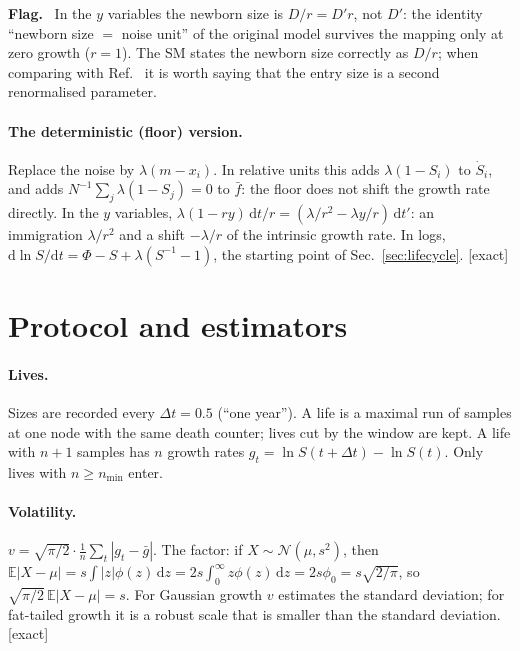 \documentclass[11pt]{article}
\newcommand{\E}{\mathbb E}
\newcommand{\fb}{\bar f}
\newcommand{\dd}{\mathrm d}
\newcommand{\exact}{\textsf{\small[exact]}}
\newenvironment{flag}{\par\medskip\noindent\textcolor{red!70!black}{\textbf{Flag.}}\ }{\par\medskip}
\begin{document}
\begin{flag}
In the $y$ variables the newborn size is $D/r=D'r$, not $D'$: the identity ``newborn size $=$ noise unit''
of the original model survives the mapping only at zero growth ($r=1$).  The SM states the newborn size
correctly as $D/r$; when comparing with Ref.~\cite{altieri2021} it is worth saying that the entry size
is a second renormalised parameter.
\end{flag}

\paragraph{The deterministic (floor) version.}  Replace the noise by $\lambda(m-x_i)$.  In relative units this
adds $\lambda(1-S_i)$ to $\dot S_i$, and adds $N^{-1}\sum_j\lambda(1-S_j)=0$ to $\fb$: the floor does not shift
the growth rate directly.  In the $y$ variables, $\lambda(1-ry)\,\dd t/r=(\lambda/r^2-\lambda y/r)\,\dd t'$: an
immigration $\lambda/r^2$ and a shift $-\lambda/r$ of the intrinsic growth rate.  In logs,
$\dd\ln S/\dd t=\Phi-S+\lambda(S^{-1}-1)$, the starting point of Sec.~\ref{sec:lifecycle}.  \exact

\section{Protocol and estimators}
\label{sec:protocol}

\paragraph{Lives.}  Sizes are recorded every $\Delta t=0.5$ (``one year'').  A life is a maximal run of
samples at one node with the same death counter; lives cut by the window are kept.  A life with $n+1$
samples has $n$ growth rates $g_t=\ln S(t+\Delta t)-\ln S(t)$.  Only lives with $n\ge n_{\min}$ enter.

\paragraph{Volatility.}  $v=\sqrt{\pi/2}\cdot\frac1n\sum_t|g_t-\bar g|$.  The factor: if
$X\sim\mathcal N(\mu,s^2)$, then $\E|X-\mu|=s\int|z|\phi(z)\,\dd z=2s\int_0^\infty z\phi(z)\,\dd z=2s\phi_0=s\sqrt{2/\pi}$,
so $\sqrt{\pi/2}\,\E|X-\mu|=s$.  For Gaussian growth $v$ estimates the standard deviation; for fat-tailed
growth it is a robust scale that is smaller than the standard deviation.  \exact
\end{document}
